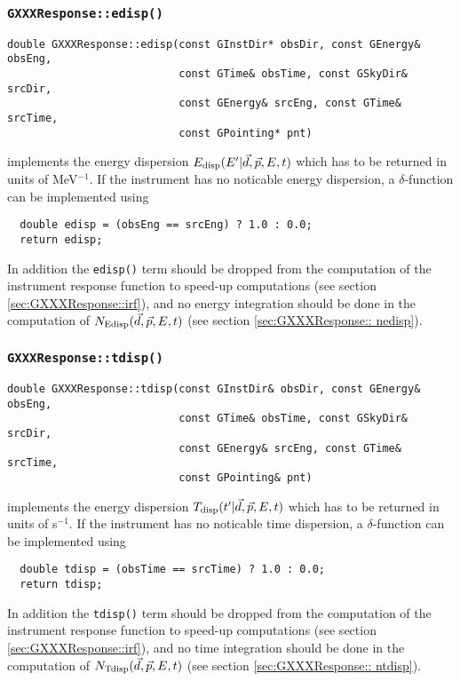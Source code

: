 \documentclass{article}[12pt,a4]
\begin{document}
\subsubsection{{\tt GXXXResponse::edisp()}}

\begin{verbatim}
double GXXXResponse::edisp(const GInstDir* obsDir, const GEnergy& obsEng,
                           const GTime& obsTime, const GSkyDir& srcDir,
                           const GEnergy& srcEng, const GTime& srcTime,
                           const GPointing* pnt)
\end{verbatim}
implements the energy dispersion $E_{\rm disp}(E' | \vec{d}, \vec{p}, E, t)$ which has to be returned
in units of MeV$^{-1}$.
If the instrument has no noticable energy dispersion, a $\delta$-function can be implemented
using
\begin{verbatim}
  double edisp = (obsEng == srcEng) ? 1.0 : 0.0;
  return edisp;
\end{verbatim}
In addition the {\tt edisp()} term should be dropped from the computation of the 
instrument response function to speed-up computations
(see section \ref{sec:GXXXResponse::irf}),
and no energy integration should be done in the computation of
$N_{\rm Edisp}(\vec{d}, \vec{p}, E, t)$ (see section \ref{sec:GXXXResponse:: nedisp}).


\subsubsection{{\tt GXXXResponse::tdisp()}}

\begin{verbatim}
double GXXXResponse::tdisp(const GInstDir& obsDir, const GEnergy& obsEng,
                           const GTime& obsTime, const GSkyDir& srcDir,
                           const GEnergy& srcEng, const GTime& srcTime,
                           const GPointing& pnt)
\end{verbatim}
implements the energy dispersion $T_{\rm disp}(t' | \vec{d}, \vec{p}, E, t)$ which has to be returned
in units of s$^{-1}$.
If the instrument has no noticable time dispersion, a $\delta$-function can be implemented
using
\begin{verbatim}
  double tdisp = (obsTime == srcTime) ? 1.0 : 0.0;
  return tdisp;
\end{verbatim}
In addition the {\tt tdisp()} term should be dropped from the computation of the 
instrument response function to speed-up computations
(see section \ref{sec:GXXXResponse::irf}),
and no time integration should be done in the computation of
$N_{\rm Tdisp}(\vec{d}, \vec{p}, E, t)$ (see section \ref{sec:GXXXResponse:: ntdisp}).
\end{document}
